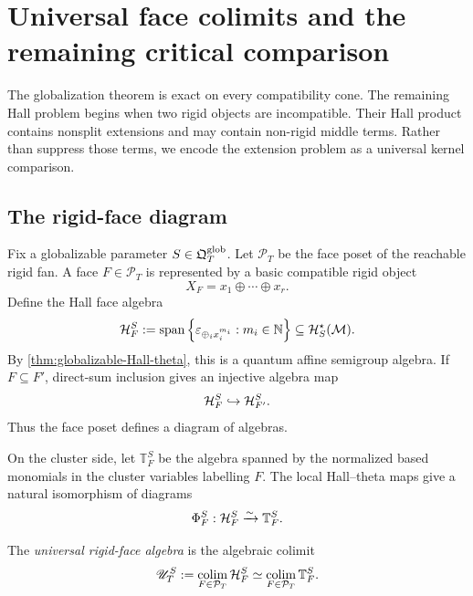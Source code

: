 \section{Universal face colimits and the remaining critical comparison}
\label{sec:colimit-critical}

The globalization theorem is exact on every compatibility cone.  The
remaining Hall problem begins when two rigid objects are incompatible.  Their
Hall product contains nonsplit extensions and may contain non-rigid middle
terms.  Rather than suppress those terms, we encode the extension problem as
a universal kernel comparison.

\subsection{The rigid-face diagram}

Fix a globalizable parameter $S\in\mathfrak Q^{\mathrm{glob}}_T$.  Let
$\mathcal P_T$ be the face poset of the reachable rigid fan.  A face
$F\in\mathcal P_T$ is represented by a basic compatible rigid object
\[
 X_F=x_1\oplus\cdots\oplus x_r.
\]
Define the Hall face algebra
\begin{equation}
 \mathcal H_F^S
 :=\operatorname{span}\left\{
       \varepsilon_{\oplus_i x_i^{m_i}}:
       m_i\in\mathbb N
      \right\}
 \subseteq\mathcal H_S^\star(\mathcal M).
 \label{eq:Hall-face-algebra}
\end{equation}
By \cref{thm:globalizable-Hall-theta}, this is a quantum affine semigroup
algebra.  If $F\subseteq F'$, direct-sum inclusion gives an injective algebra
map
\[
 \mathcal H_F^S\hookrightarrow\mathcal H_{F'}^S.
\]
Thus the face poset defines a diagram of algebras.

On the cluster side, let $\mathbb T_F^S$ be the algebra spanned by the
normalized based monomials in the cluster variables labelling $F$.  The local
Hall--theta maps give a natural isomorphism of diagrams
\begin{equation}
 \Phi_F^S:\mathcal H_F^S\xrightarrow{\sim}\mathbb T_F^S.
 \label{eq:diagram-isomorphism}
\end{equation}

\begin{definition}
\label{def:universal-face-algebra}
The \emph{universal rigid-face algebra} is the algebraic colimit
\begin{equation}
 \mathscr U_T^S
 :=\operatorname*{colim}_{F\in\mathcal P_T}\mathcal H_F^S
 \simeq\operatorname*{colim}_{F\in\mathcal P_T}\mathbb T_F^S.
 \label{eq:universal-face-colimit}
\end{equation}
\end{definition}

